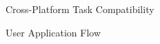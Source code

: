 \begin{figure}
	\centering
	
	\caption{Cross-Platform Task Compatibility}
	\label{fig:multiplatform_tasks}
\end{figure}

\begin{figure}
	\centering
	
	\caption{User Application Flow}
	\label{fig:user_app_design}
\end{figure}


